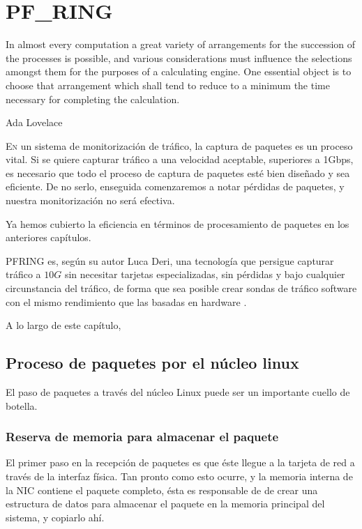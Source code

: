 \chapter{PF\_RING}
\pagestyle{esitscCD}

\epigraph{In almost every computation a great variety of arrangements for the succession of the processes is possible, 
and various considerations must influence the selections amongst them for the purposes of a calculating engine. One 
essential object is to choose that arrangement which shall tend to reduce to a minimum the time necessary for completing 
the calculation.}{Ada Lovelace}

\lettrine[lraise=-0.1, lines=2, loversize=0.25]{E}n un sistema de monitorización de tráfico, la captura de paquetes es 
un proceso vital. Si se quiere capturar tráfico a una velocidad aceptable, superiores a 1Gbps, es necesario que todo el 
proceso de captura de paquetes esté bien diseñado y sea eficiente. De no serlo, enseguida comenzaremos a notar 
pérdidas de paquetes, y nuestra monitorización no será efectiva.

Ya hemos cubierto la eficiencia en términos de procesamiento de paquetes en los anteriores capítulos. 

\gls{PFRING} es, según su autor Luca Deri, una tecnología que persigue capturar tráfico a $10G$ sin necesitar tarjetas 
especializadas, sin pérdidas y bajo cualquier circunstancia del tráfico, de forma que sea posible crear sondas de 
tráfico software con el mismo rendimiento que las basadas en hardware \cite{LucaDeriPFRING}.

A lo largo de este capítulo, %

\section{Proceso de paquetes por el núcleo linux}
El paso de paquetes a través del núcleo Linux puede ser un importante cuello de botella. %

\subsection{Reserva de memoria para almacenar el paquete}
El primer paso en la recepción de paquetes es que éste llegue a la tarjeta de red a través de la interfaz física. Tan 
pronto como esto ocurre, y la memoria interna de la \gls{NIC} contiene el paquete completo, ésta es responsable de 
de crear una estructura de datos para almacenar el paquete en la memoria principal del sistema, y copiarlo ahí.

